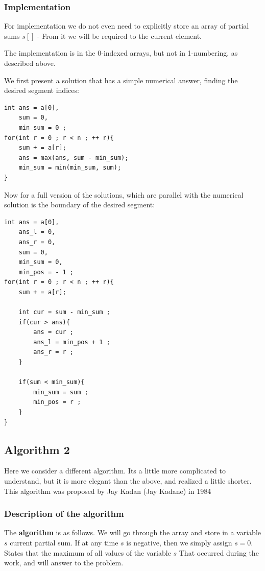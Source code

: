 \subsubsection{ Implementation }

For implementation we do not even need to explicitly store an array of partial sums $s []$ - From it we will be required to the current element.

The implementation is in the 0-indexed arrays, but not in 1-numbering, as described above.

We first present a solution that has a simple numerical answer, finding the desired segment indices:

\begin{verbatim}
int ans = a[0],
    sum = 0,
    min_sum = 0 ;
for(int r = 0 ; r < n ; ++ r){
    sum + = a[r];
    ans = max(ans, sum - min_sum);
    min_sum = min(min_sum, sum);
} 
\end{verbatim}
Now for a full version of the solutions, which are parallel with the numerical solution is the boundary of the desired segment:

\begin{verbatim}
int ans = a[0],
    ans_l = 0,
    ans_r = 0,
    sum = 0,
    min_sum = 0,
    min_pos = - 1 ;
for(int r = 0 ; r < n ; ++ r){
    sum + = a[r];
 
    int cur = sum - min_sum ;
    if(cur > ans){
        ans = cur ;
        ans_l = min_pos + 1 ;
        ans_r = r ;
    }
 
    if(sum < min_sum){
        min_sum = sum ;
        min_pos = r ;
    }
} 
\end{verbatim}
\subsection{ Algorithm 2 }

Here we consider a different algorithm. Its a little more complicated to understand, but it is more elegant than the above, and realized a little shorter. This algorithm was proposed by Jay Kadan (Jay Kadane) in 1984

\subsubsection{ Description of the algorithm }

The \textbf{algorithm} is as follows. We will go through the array and store in a variable $s$ current partial sum. If at any time $s$ is negative, then we simply assign $s = 0$. States that the maximum of all values ​​of the variable $s$ That occurred during the work, and will answer to the problem.

